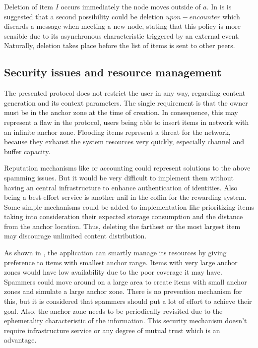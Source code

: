 Deletion of item $I$ occurs immediately the node moves outside of $a$. In
\cite{percomfloatingcontent} is is suggested that a second possibility could be
deletion $upon-encounter$ which discards a message when meeting a new node,
stating that this policy is more sensible due to its asynchronous
characteristic triggered by an external event. Naturally, deletion takes place
before the list of items is sent to other peers.

\subsection{Security issues and resource management}

The presented protocol does not restrict the user in any way, regarding content
generation and its context parameters. The single requirement is that the owner
must be in the anchor zone at the time of creation. In consequence, this may
represent a flaw in the protocol, users being able to insert items in network
with an infinite anchor zone. Flooding items represent a threat for the network,
because they exhaust the system resources very quickly, especially channel and
buffer capacity.

Reputation mechanisms like \cite{reputation} or accounting could represent
solutions to the above spamming issues. But it would be very difficult to
implement them without having an central infrastructure to enhance
authentication of identities. Also being a best-effort service is another nail
in the coffin for the rewarding system. Some simple mechanisms could be added to
implementation like prioritizing items taking into consideration their expected
storage consumption and the distance from the anchor location. Thus, deleting
the farthest or the most largest item may discourage unlimited content distribution.

As shown in \cite{percomfloatingcontent}, the application can smartly manage its
resources by giving preference to items with smallest anchor range. Items with
very large anchor zones would have low availability due to the poor coverage it
may have. Spammers could move around on a large area to create items with small
anchor zones and simulate a large anchor zone. There is no prevention mechanism
for this, but it is considered that spammers should put a lot of effort to
achieve their goal. Also, the anchor zone needs to be periodically revisited due
to the ephemerality characteristic of the information. This security mechanism
doesn't require infrastructure service or any degree of mutual trust which is an
advantage.


